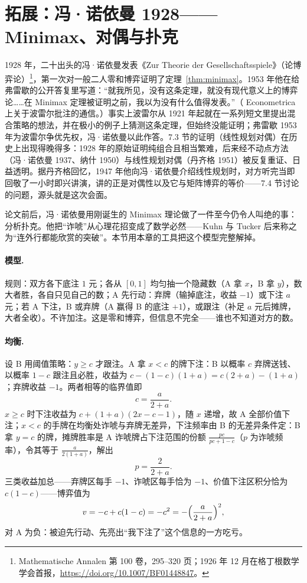 \documentclass[UTF8,a4paper,11pt,oneside,openany,fontset=fandol]{ctexbook}
\theoremstyle{definition}
\begin{document}
\section{拓展：冯·诺依曼 1928——Minimax、对偶与扑克}
1928 年，二十出头的冯·诺依曼发表《Zur Theorie der Gesellschaftsspiele》（论博弈论）\footnote{Mathematische Annalen 第 100 卷，295--320 页；1926 年 12 月在格丁根数学学会首报，\url{https://doi.org/10.1007/BF01448847}。}，第一次对一般二人零和博弈证明了定理~\ref{thm:minimax}。1953 年他在给弗雷歇的公开答复里写道：“就我所见，没有这条定理，就没有现代意义上的博弈论……在 Minimax 定理被证明之前，我以为没有什么值得发表。”（ Econometrica 上关于波雷尔批注的通信。）事实上波雷尔从 1921 年起就在一系列短文里提出混合策略的想法，并在极小的例子上猜测这条定理，但始终没能证明；弗雷歇 1953 年为波雷尔争优先权，冯·诺依曼以此作答。7.3 节的证明（线性规划对偶）在历史上出现得晚得多：1928 年的原始证明纯组合且相当繁难，后来经不动点方法（冯·诺依曼 1937、纳什 1950）与线性规划对偶（丹齐格 1951）被反复重证、日益透明。据丹齐格回忆，1947 年他向冯·诺依曼介绍线性规划时，对方听完当即回敬了一小时即兴讲演，讲的正是对偶性以及它与矩阵博弈的等价——7.4 节讨论的问题，源头就是这次会面。

论文前后，冯·诺依曼用刚诞生的 Minimax 理论做了一件至今仍令人叫绝的事：分析扑克。他把“诈唬”从心理花招变成了数学必然——Kuhn 与 Tucker 后来称之为“连外行都能欣赏的突破”。本节用本章的工具把这个模型完整解掉。

\paragraph{模型.} 规则：双方各下底注 $1$ 元；各从 $[0,1]$ 均匀抽一个隐藏数（A 拿 $x$，B 拿 $y$），数大者胜，各自只见自己的数；A 先行动：弃牌（输掉底注，收益 $-1$）或下注 $a$ 元；若 A 下注，B 或弃牌（A 赢得 B 的底注 $+1$），或跟注（补足 $a$ 元后摊牌，大者全收）。不许加注。这是零和博弈，但信息不完全——谁也不知道对方的数。

\paragraph{均衡.} 设 B 用阈值策略：$y\ge c$ 才跟注。A 拿 $x<c$ 的牌下注：B 以概率 $c$ 弃牌送钱、以概率 $1-c$ 跟注且必胜，收益为 $c-(1-c)(1+a)=c(2+a)-(1+a)$；弃牌收益 $-1$。两者相等的临界值即
\[
 c=\frac{a}{2+a}.
\]
$x\ge c$ 时下注收益为 $c+(1+a)(2x-c-1)$，随 $x$ 递增，故 A 全部价值下注；$x<c$ 的手牌在均衡处诈唬与弃牌无差异，下注频率由 B 的无差异条件定：B 拿 $y=c$ 的牌，摊牌胜率是 A 诈唬牌占下注范围的份额 $\tfrac{pc}{pc+1-c}$（$p$ 为诈唬频率），令其等于 $\tfrac{a}{2(1+a)}$，解出
\[
 p=\frac{2}{2+a}.
\]
三类收益加总——弃牌区每手 $-1$、诈唬区每手恰为 $-1$、价值下注区积分恰为 $c(1-c)$——博弈值为
\[
 v=-c+c(1-c)=-c^{2}=-\Bigl(\frac{a}{2+a}\Bigr)^{2},
\]
对 A 为负：被迫先行动、先亮出“我下注了”这个信息的一方吃亏。
\end{document}
